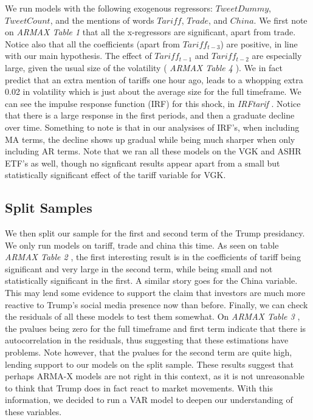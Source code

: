 \documentclass[
]{book}
\begin{document}
We run models with the following exogenous regressors: \(TweetDummy\), \(TweetCount\),
and the mentions of words \(Tariff\), \(Trade\), and \(China\). We first note on
{ \emph{ARMAX Table 1} } that all the x-regressors are significant,
apart from trade. Notice also that all the coefficients (apart from \(Tariff_{t-3}\))
are positive, in line with our main hypothesis. The effect of \(Tariff_{t-1}\) and
\(Tariff_{t-2}\) are especially large, given the usual size of the volatility
({ \emph{ARMAX Table 4} }). We in fact predict that an
extra mention of tariffs one hour ago, leads to a whopping extra 0.02 in volatility
which is just about the average size for the full timeframe. We can see the
impulse response function (IRF) for this shock, in { \emph{IRFtarif} }.
Notice that there is a large response in the first periods, and then a graduate
decline over time. Something to note is that in our analysises of IRF's, when including
MA terms, the decline shows up gradual while being much sharper when only including
AR terms.
Note that we ran all these models on the VGK and ASHR ETF's as well, though no
signficant results appear apart from a small but statistically significant effect
of the tariff variable for VGK.

\subsection{Split Samples}\label{split-samples}

We then split our sample for the first and second term of the Trump presidancy.
We only run models on tariff, trade and china this time. As seen on table
{ \emph{ARMAX Table 2} }, the first interesting result
is in the coefficients of tariff being significant and very large in the second
term, while being small and not statistically significant in the first. A similar
story goes for the China variable. This may lend some evidence to support the
claim that investors are much more reactive to Trump's social media presence
now than before.
Finally, we can check the residuals of all these models to test them somewhat.
On { \emph{ARMAX Table 3} }, the pvalues being zero
for the full timeframe and first term indicate that there is autocorrelation in
the residuals, thus suggesting that these estimations have problems. Note however,
that the pvalues for the second term are quite high, lending support to our
models on the split sample. These results suggest that perhaps ARMA-X models are
not right in this context, as it is not unreasonable to think that Trump does
in fact react to market movements. With this information, we decided to run
a VAR model to deepen our understanding of these variables.
\end{document}
